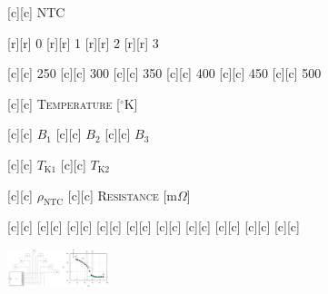 [c][c] {\scriptsize \textsc{NTC}}

[r][r] {\scriptsize 0}
[r][r] {\scriptsize 1}
[r][r] {\scriptsize 2}
[r][r] {\scriptsize 3}

[c][c] {\scriptsize 250}
[c][c] {\scriptsize 300}
[c][c] {\scriptsize 350}
[c][c] {\scriptsize 400}
[c][c] {\scriptsize 450}
[c][c] {\scriptsize 500}

[c][c] {\scriptsize \textsc{Temperature} [$^{\circ}$K]}

[c][c] {\scriptsize $B_{1}$}
[c][c] {\scriptsize $B_{2}$}
[c][c] {\scriptsize $B_{3}$}

[c][c] {\scriptsize $T_{\text{K1}}$}
[c][c] {\scriptsize $T_{\text{K2}}$}

[c][c] {\scriptsize $\rho_{\text{NTC}}$}
[c][c] {\scriptsize \textsc{Resistance} [m$\Omega$]}

[c][c] {}
[c][c] {}
[c][c] {}
[c][c] {}
[c][c] {}
[c][c] {}
[c][c] {}
[c][c] {}
[c][c] {}
[c][c] {}

\includegraphics[width=0.22\textwidth]{semiconductorBA.eps}